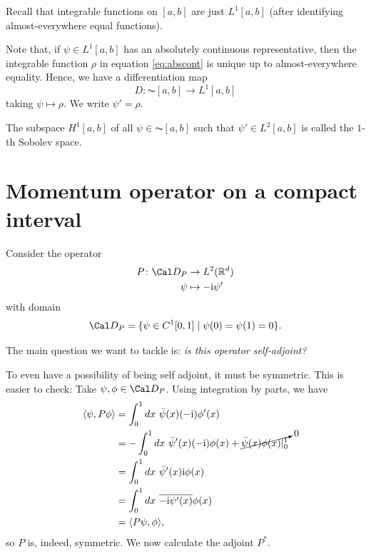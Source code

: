 Recall that integrable functions on \([a,b]\) are just \(L^{1}[a,b]\)
(after identifying almost-everywhere equal functions).

Note that, if \(\psi\in L^{1}[a,b]\) has an absolutely continuous
representative, then the integrable function \(\rho\) in equation
\eqref{eq:abscont} is unique up to almost-everywhere equality.
Hence, we have a differentiation map
\begin{equation}
  D \colon \AC[a,b]\to L^{1}[a,b]
\end{equation}
taking \(\psi\mapsto\rho\). We write \(\psi'=\rho\).

\begin{definition}
  The subspace \(H^{1}[a,b]\) of all \(\psi\in\AC[a,b]\) such that
  \(\psi'\in L^{2}[a,b]\) is called the \(1\)-th Sobolev space.
\end{definition}

\section{Momentum operator on a compact interval}

Consider the operator
\begin{align}
  P \colon \Cal D_P &\to L^{2}(\R^{d}) \\
  \psi & \mapsto -\ic \psi'
\end{align}
with domain
\begin{equation}
  \Cal D_P = \{\psi\in C^{1}[0,1] \mid \psi(0)=\psi(1)=0\}
.\end{equation}

The main question we want to tackle is:
\emph{is this operator self-adjoint?}

To even have a possibility of being self adjoint, it must be
symmetric. This is easier to check:
Take \(\psi,\phi\in\Cal D_P\). Using integration by parts, we have
\begin{align}
  \langle \psi,P\phi\rangle
  &= \int_{0}^{1} dx\ \bar\psi(x) (-\mathrm{i}) \phi'(x) \\
  &= - \int_{0}^{1} dx \ \bar\psi'(x) (-\mathrm{i}) \phi(x)
  + \cancelto{0}{\bar\psi(x)\phi(x) |_0^{1}} \label{eq:cancellation}\\
  &= \int_{0}^{1} dx \ \bar\psi'(x) \mathrm{i} \phi(x) \\
  &= \int_{0}^{1} dx \ \overline{-\mathrm{i}\psi'(x)} \phi(x) \\
  &= \langle P\psi,\phi\rangle
,\end{align}
so \(P\) is, indeed, symmetric.
We now calculate the adjoint \(P^{*}\).

